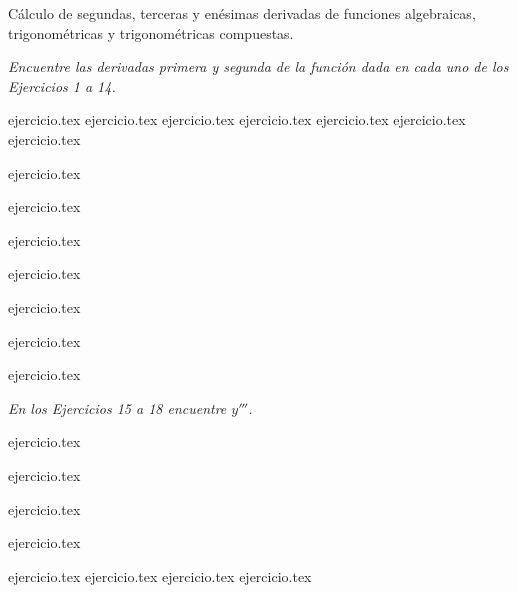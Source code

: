 
Cálculo de segundas, terceras y enésimas derivadas de funciones algebraicas, trigonométricas y trigonométricas compuestas.

\noindent \textit{Encuentre las derivadas primera y segunda de la función dada en cada uno de los Ejercicios 1 a 14.}

\begin{enumerate}
    \begin{minipage}{0.45\textwidth}
    {ejercicio.tex}
    {ejercicio.tex}
    {ejercicio.tex}
    {ejercicio.tex}
    {ejercicio.tex}
    {ejercicio.tex}
    {ejercicio.tex}
    \end{minipage}%
    \begin{minipage}{0.45\textwidth}
    \setcounter{enumi}{1}
    {ejercicio.tex}
    \addtocounter{enumi}{1}
    {ejercicio.tex}
    \addtocounter{enumi}{1}
    {ejercicio.tex}
    \addtocounter{enumi}{1}
    {ejercicio.tex}
    \addtocounter{enumi}{1}
    {ejercicio.tex}
    \addtocounter{enumi}{1}
    {ejercicio.tex}
    \addtocounter{enumi}{1}
    {ejercicio.tex}
    \end{minipage}
\end{enumerate}

\noindent \textit{En los Ejercicios 15 a 18 encuentre $y'''$.}

\begin{enumerate}
    \begin{minipage}{0.45\textwidth}
    \setcounter{enumi}{14}
    {ejercicio.tex}
    \addtocounter{enumi}{1}
    {ejercicio.tex}
    \end{minipage}%
    \begin{minipage}{0.45\textwidth}
    \setcounter{enumi}{15}
    {ejercicio.tex}
    \addtocounter{enumi}{1}
    {ejercicio.tex}
    \end{minipage}
\end{enumerate}

\begin{enumerate}
    \setcounter{enumi}{18}
    {ejercicio.tex}
    {ejercicio.tex}
    {ejercicio.tex}
    {ejercicio.tex}
\end{enumerate}

